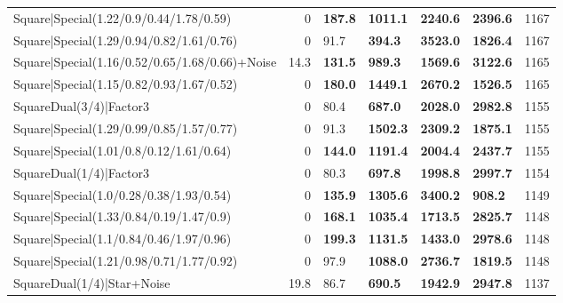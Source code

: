 \begin{tabular}{lrllllr}
 Square|Special(1.22/0.9/0.44/1.78/0.59)                       &             0   & \textbf{187.8} & \textbf{1011.1} & \textbf{2240.6} & \textbf{2396.6} &         1167 \\
 Square|Special(1.29/0.94/0.82/1.61/0.76)                      &             0   & 91.7           & \textbf{394.3}  & \textbf{3523.0} & \textbf{1826.4} &         1167 \\
 Square|Special(1.16/0.52/0.65/1.68/0.66)+Noise                &            14.3 & \textbf{131.5} & \textbf{989.3}  & \textbf{1569.6} & \textbf{3122.6} &         1165 \\
 Square|Special(1.15/0.82/0.93/1.67/0.52)                      &             0   & \textbf{180.0} & \textbf{1449.1} & \textbf{2670.2} & \textbf{1526.5} &         1165 \\
 SquareDual(3/4)|Factor3                                       &             0   & 80.4           & \textbf{687.0}  & \textbf{2028.0} & \textbf{2982.8} &         1155 \\
 Square|Special(1.29/0.99/0.85/1.57/0.77)                      &             0   & 91.3           & \textbf{1502.3} & \textbf{2309.2} & \textbf{1875.1} &         1155 \\
 Square|Special(1.01/0.8/0.12/1.61/0.64)                       &             0   & \textbf{144.0} & \textbf{1191.4} & \textbf{2004.4} & \textbf{2437.7} &         1155 \\
 SquareDual(1/4)|Factor3                                       &             0   & 80.3           & \textbf{697.8}  & \textbf{1998.8} & \textbf{2997.7} &         1154 \\
 Square|Special(1.0/0.28/0.38/1.93/0.54)                       &             0   & \textbf{135.9} & \textbf{1305.6} & \textbf{3400.2} & \textbf{908.2}  &         1149 \\
 Square|Special(1.33/0.84/0.19/1.47/0.9)                       &             0   & \textbf{168.1} & \textbf{1035.4} & \textbf{1713.5} & \textbf{2825.7} &         1148 \\
 Square|Special(1.1/0.84/0.46/1.97/0.96)                       &             0   & \textbf{199.3} & \textbf{1131.5} & \textbf{1433.0} & \textbf{2978.6} &         1148 \\
 Square|Special(1.21/0.98/0.71/1.77/0.92)                      &             0   & 97.9           & \textbf{1088.0} & \textbf{2736.7} & \textbf{1819.5} &         1148 \\
 SquareDual(1/4)|Star+Noise                                    &            19.8 & 86.7           & \textbf{690.5}  & \textbf{1942.9} & \textbf{2947.8} &         1137 \\

\end{tabular}
